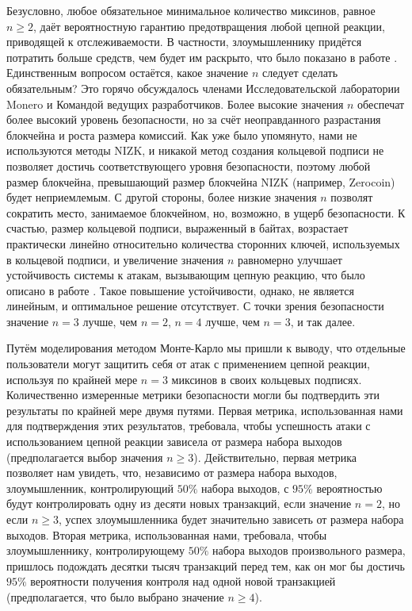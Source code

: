 \documentclass{mrl}
\begin{document}
Безусловно, любое обязательное минимальное количество миксинов, равное $n \geq 2$, даёт вероятностную гарантию предотвращения любой цепной реакции, приводящей к отслеживаемости. В частности, злоумышленнику придётся потратить больше средств, чем будет им раскрыто, что было показано в работе \cite{chainReactions}. Единственным вопросом остаётся, какое значение $n$ следует сделать обязательным? Это горячо обсуждалось членами Исследовательской лаборатории Monero и Командой ведущих разработчиков. Более высокие значения $n$ обеспечат более высокий уровень безопасности, но за счёт неоправданного разрастания блокчейна и роста размера комиссий. Как уже было упомянуто, нами не используются методы NIZK, и никакой метод создания кольцевой подписи не позволяет достичь соответствующего уровня безопасности, поэтому любой размер блокчейна, превышающий размер блокчейна NIZK (например, Zerocoin) будет неприемлемым. С другой стороны, более низкие значения $n$ позволят сократить место, занимаемое блокчейном, но, возможно, в ущерб безопасности. К счастью, размер кольцевой подписи, выраженный в байтах, возрастает практически линейно относительно количества сторонних ключей, используемых в кольцевой подписи, и увеличение значения $n$ равномерно улучшает устойчивость системы к атакам, вызывающим цепную реакцию, что было описано в работе \cite{chainReactions}. Такое повышение устойчивости, однако, не является линейным, и оптимальное решение отсутствует. С точки зрения безопасности значение $n=3$ лучше, чем $n=2$, $n=4$ лучше, чем $n=3$, и так далее.

Путём моделирования методом Монте-Карло \cite{saturationUTXO} мы пришли к выводу, что отдельные пользователи могут защитить себя от атак с применением цепной реакции, используя по крайней мере $n=3$ миксинов в своих кольцевых подписях. Количественно измеренные метрики безопасности могли бы подтвердить эти результаты по крайней мере двумя путями. Первая метрика, использованная нами для подтверждения этих результатов, требовала, чтобы успешность атаки с использованием цепной реакции зависела от размера набора выходов (предполагается выбор значения $n \geq 3$). Действительно, первая метрика позволяет нам увидеть, что, независимо от размера набора выходов, злоумышленник, контролирующий $50\%$ набора выходов, с $95\%$ вероятностью будут контролировать одну из десяти новых транзакций, если значение $n=2$, но если $n\geq 3$, успех злоумышленника будет значительно зависеть от размера набора выходов. Вторая метрика, использованная нами, требовала, чтобы злоумышленнику, контролирующему $50\%$ набора выходов произвольного размера, пришлось подождать десятки тысяч транзакций перед тем, как он мог бы достичь $95\%$ вероятности получения контроля над одной новой транзакцией (предполагается, что было выбрано значение $n \geq 4$).
\end{document}
